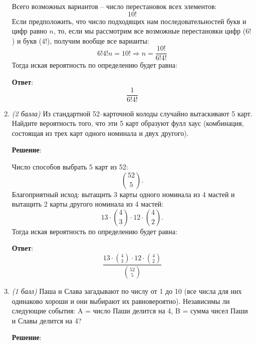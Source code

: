 \documentclass{article}
\begin{document}
\begin{enumerate}
    Всего возможных вариантов -- число перестановок всех элементов:
    \begin{equation}
        10!
    \end{equation}
    Если предположить, что число подходящих нам последовательностей букв и цифр равно $n$, то, если мы рассмотрим все возможные перестановки цифр ($6!$) и букв ($4!$), получим вообще все варианты:
    \begin{equation}
        6!4!n = 10! \Rightarrow n = \frac{10!}{6!4!}
    \end{equation}
    Тогда иская вероятность по определению будет равна:

    \textbf{Ответ}:
    $$\dfrac{1}{6!4!}$$

    \item \textit{(2 балла)} Из стандартной 52–карточной колоды случайно вытаскивают 5 карт. Найдите вероятность того, что эти 5 карт образуют фулл хаус (комбинация, состоящая
    из трех карт одного номинала и двух другого).

    \textbf{Решение}:

    Число способов выбрать 5 карт из 52:
    \begin{equation}
        \binom{52}{5}.
    \end{equation}
    Благоприятный исход: вытащить 3 карты одного номинала из 4 мастей и вытащить 2 карты другого номинала из 4 мастей:
    \begin{equation}
        13 \cdot \binom{4}{3} \cdot 12 \cdot \binom{4}{2}.
    \end{equation}
    Тогда иская вероятность по определению будет равна:

    \textbf{Ответ}:
    $$\dfrac{13 \cdot \binom{4}{3} \cdot 12 \cdot \binom{4}{2}}{\binom{52}{5}}$$


    \item \textit{(1 балл)} Паша и Слава загадывают по числу от 1 до 10 (все числа для них одинаково
    хороши и они выбирают их равновероятно). Независимы ли следующие события:
    A = число Паши делится на 4,
    B = сумма чисел Паши и Славы делится на 4?

    \textbf{Решение}:


\end{enumerate}
\end{document}
